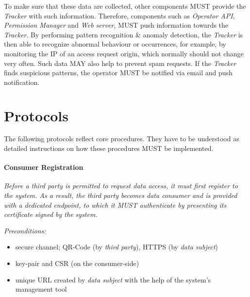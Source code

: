 \documentclass[12pt,english,a4paper,titlepage,cleardoublepage=empty,dottedtoc]{report}
\providecommand{\tightlist}{%
  \setlength{\itemsep}{0pt}\setlength{\parskip}{0pt}}
\begin{document}
To make sure that these data are collected, other components MUST
provide the \emph{Tracker} with such information. Therefore, components
such as \emph{Operator API}, \emph{Permission Manager} and \emph{Web
server}, MUST push information towards the \emph{Tracker}. By performing
pattern recognition \& anomaly detection, the \emph{Tracker} is then
able to recognize abnormal behaviour or occurrences, for example, by
monitoring the IP of an access request origin, which normally should not
change very often. Such data MAY also help to prevent spam requests. If
the \emph{Tracker} finds suspicious patterns, the operator MUST be
notified via email and push notification.

\section{Protocols}\label{protocols}

The following protocols reflect core procedures. They have to be
understood as detailed instructions on how these procedures MUST be
implemented.

\paragraph{Consumer Registration}\label{consumer-registration}

\emph{Before a third party is permitted to request data access, it must
first register to the system. As a result, the third party becomes data
consumer and is provided with a dedicated endpoint, to which it MUST
authenticate by presenting its certificate signed by the system.}

\emph{Preconditions:}

\begin{itemize}
\tightlist
\item
  secure channel; QR-Code (by \emph{third party}), HTTPS (by \emph{data
  subject})
\item
  key-pair and CSR (on the consumer-side)
\item
  unique URL created by \emph{data subject} with the help of the
  system's management tool
\end{itemize}
\end{document}
